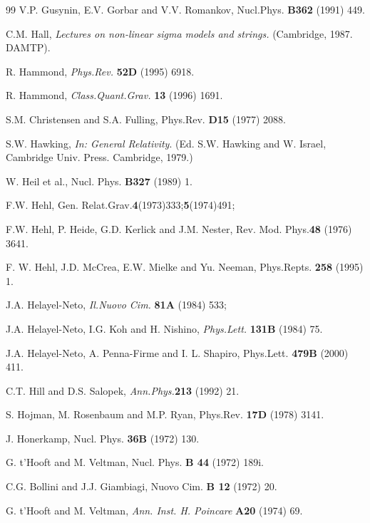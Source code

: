 \begin{thebibliography}{99}
 V.P. Gusynin, E.V. Gorbar and V.V. Romankov, 
Nucl.Phys. {\bf B362} (1991) 449. %

 C.M. Hall, {\sl Lectures on non-linear sigma
models and strings.} (Cambridge, 1987. DAMTP). 

R. Hammond, {\sl Phys.Rev.} {\bf 52D} (1995) 6918.

 R. Hammond, {\sl Class.Quant.Grav.} {\bf 13}
(1996) 1691.

S.M. Christensen and S.A. Fulling, Phys.Rev. {\bf D15} (1977) 2088.

 S.W. Hawking, {\sl In: General Relativity}.
(Ed. S.W. Hawking and W. Israel, Cambridge Univ. Press. Cambridge, 1979.)

 W. Heil  et al., Nucl. Phys. {\bf B327} (1989) 1.

 F.W. Hehl, Gen. Relat.Grav.{\bf 4}(1973)333;{\bf5}(1974)491;

F.W. Hehl, P. Heide, G.D. Kerlick and J.M. Nester,
      Rev. Mod. Phys.{\bf 48} (1976) 3641.

 F. W. Hehl, J.D. McCrea, E.W. Mielke
and Yu. Neeman, Phys.Repts. {\bf 258} (1995) 1.

 J.A. Helayel-Neto, {\sl Il.Nuovo Cim.} {\bf 81A}
(1984) 533; 

J.A. Helayel-Neto, I.G. Koh and H. Nishino,
{\sl Phys.Lett.} {\bf 131B} (1984) 75.

J.A. Helayel-Neto, A. Penna-Firme and I. L. Shapiro,
Phys.Lett. {\bf 479B} (2000) 411.

 C.T. Hill and D.S. Salopek, {\sl Ann.Phys.}{\bf 213} (1992) 21.

 S. Hojman, M. Rosenbaum and M.P. Ryan, 
Phys.Rev. {\bf 17D} (1978) 3141. %

 J. Honerkamp, %
Nucl. Phys. {\bf 36B} (1972) 130. %

G. t'Hooft and M. Veltman, 
Nucl. Phys. {\bf B 44} (1972) 189i.  %

C.G. Bollini and J.J. Giambiagi, 
Nuovo Cim. {\bf B 12} (1972) 20.  %
 
G. t'Hooft and M. Veltman, {\sl Ann. Inst. H. Poincare} {\bf A20}
(1974) 69.


\end{thebibliography}
